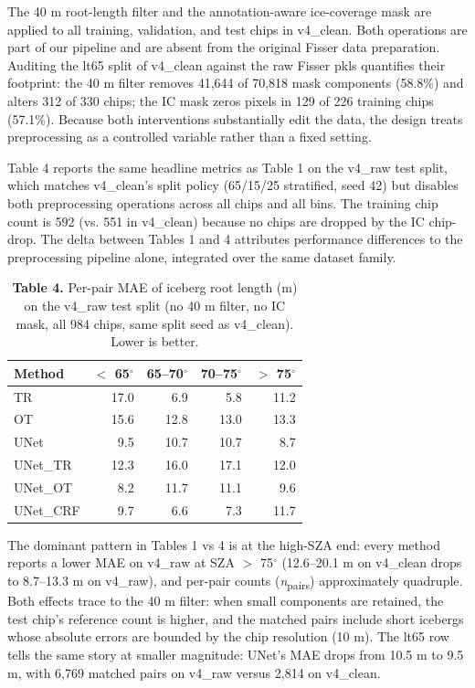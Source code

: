 \documentclass[review,jog]{igs}
\begin{document}
The 40 m root-length filter and the annotation-aware ice-coverage mask are applied to all training, validation, and test chips in v4\_clean. Both operations are part of our pipeline and are absent from the original Fisser data preparation. Auditing the lt65 split of v4\_clean against the raw Fisser pkls quantifies their footprint: the 40 m filter removes 41,644 of 70,818 mask components (58.8\%) and alters 312 of 330 chips; the IC mask zeros pixels in 129 of 226 training chips (57.1\%). Because both interventions substantially edit the data, the design treats preprocessing as a controlled variable rather than a fixed setting.

Table 4 reports the same headline metrics as Table 1 on the v4\_raw test split, which matches v4\_clean's split policy (65/15/25 stratified, seed 42) but disables both preprocessing operations across all chips and all bins. The training chip count is 592 (vs. 551 in v4\_clean) because no chips are dropped by the IC chip-drop. The delta between Tables 1 and 4 attributes performance differences to the preprocessing pipeline alone, integrated over the same dataset family.

\begin{table}[h]
\caption{\textbf{Table 4.} Per-pair MAE of iceberg root length (m) on the v4\_raw test split (no 40 m filter, no IC mask, all 984 chips, same split seed as v4\_clean). Lower is better.}
\centering
\begin{tabular}{lrrrr}
\toprule
Method & $<$ 65$^\circ$ & 65--70$^\circ$ & 70--75$^\circ$ & $>$ 75$^\circ$ \\
\midrule
TR        & 17.0           & 6.9            & 5.8            & 11.2 \\
OT        & 15.6           & 12.8           & 13.0           & 13.3 \\
UNet      & 9.5            & 10.7           & 10.7           & 8.7  \\
UNet\_TR  & 12.3           & 16.0           & 17.1           & 12.0 \\
UNet\_OT  & 8.2            & 11.7           & 11.1           & 9.6  \\
UNet\_CRF & 9.7            & 6.6            & 7.3            & 11.7 \\
\bottomrule
\end{tabular}
\end{table}

The dominant pattern in Tables 1 vs 4 is at the high-SZA end: every method reports a lower MAE on v4\_raw at SZA $>$ 75$^\circ$ (12.6--20.1 m on v4\_clean drops to 8.7--13.3 m on v4\_raw), and per-pair counts (\textit{n}\textsubscript{pairs}) approximately quadruple. Both effects trace to the 40 m filter: when small components are retained, the test chip's reference count is higher, and the matched pairs include short icebergs whose absolute errors are bounded by the chip resolution (10 m). The lt65 row tells the same story at smaller magnitude: UNet's MAE drops from 10.5 m to 9.5 m, with 6,769 matched pairs on v4\_raw versus 2,814 on v4\_clean.
\end{document}

